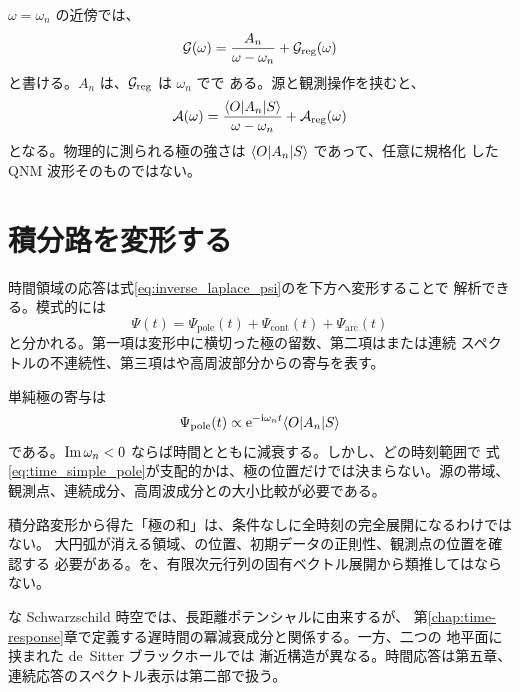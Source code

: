  $\omega=\omega_n$ の近傍では、
\begin{equation}
\mathcal{G}(\omega)
=
\frac{A_n}{\omega-\omega_n}
+\mathcal{G}_{\mathrm{reg}}(\omega)
\label{eq:green_simple_pole}
\end{equation}
と書ける。$A_n$ は、$\mathcal{G}_{\mathrm{reg}}$ は $\omega_n$ でで
ある。源と観測操作を挟むと、
\begin{equation}
\mathcal{A}(\omega)
=
\frac{
\langle O \rvert A_n\lvert S \rangle
}{
\omega-\omega_n
}
+\mathcal{A}_{\mathrm{reg}}(\omega)
\label{eq:amplitude_simple_pole}
\end{equation}
となる。物理的に測られる極の強さは $\langle O \rvert A_n\lvert S \rangle$ であって、任意に規格化
した QNM 波形そのものではない。

\section{積分路を変形する}

時間領域の応答は式\eqref{eq:inverse_laplace_psi}のを下方へ変形することで
解析できる。模式的には
\begin{equation}
\Psi(t)
=
\Psi_{\mathrm{pole}}(t)
+\Psi_{\mathrm{cont}}(t)
+\Psi_{\mathrm{arc}}(t)
\label{eq:response_decomposition}
\end{equation}
と分かれる。第一項は変形中に横切った極の留数、第二項はまたは連続
スペクトルの不連続性、第三項はや高周波部分からの寄与を表す。

単純極の寄与は
\begin{equation}
\Psi_{\mathrm{pole}}(t)
\mathrel{\propto}
\mathrm{e}^{-\mathrm{i}\omega_n t}
\langle O \rvert A_n\lvert S \rangle
\label{eq:time_simple_pole}
\end{equation}
である。$\operatorname{Im}\omega_n<0$ ならば時間とともに減衰する。しかし、どの時刻範囲で
式\eqref{eq:time_simple_pole}が支配的かは、極の位置だけでは決まらない。源の帯域、
観測点、連続成分、高周波成分との大小比較が必要である。

\begin{warningbox}
積分路変形から得た「極の和」は、条件なしに全時刻の完全展開になるわけではない。
大円弧が消える領域、の位置、初期データの正則性、観測点の位置を確認する
必要がある。を、有限次元行列の固有ベクトル展開から類推してはならない。
\end{warningbox}

な Schwarzschild 時空では、長距離ポテンシャルに由来するが、
第\ref{chap:time-response}章で定義する遅時間の冪減衰成分と関係する。一方、二つの
地平面に挟まれた de~Sitter ブラックホールでは
漸近構造が異なる。時間応答は第五章、連続応答のスペクトル表示は第二部で扱う。


